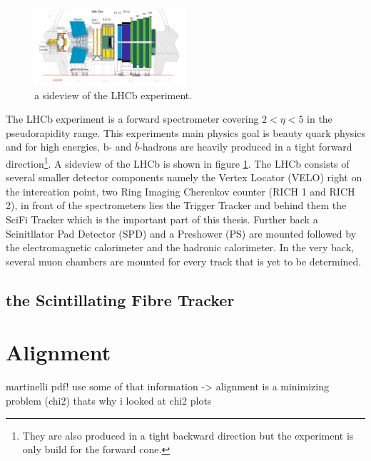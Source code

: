 \begin{figure}
  \centering
  \includegraphics[width=0.5\textwidth]{plots/LHCb_facility.png}
  \caption{a sideview of the LHCb experiment.}
  \label{fig:LHCb}
\end{figure}

The LHCb experiment is a forward spectrometer covering $2 \less \eta \less 5$ in the pseudorapidity range. This experiments main physics goal is beauty quark physics and for high energies, b- and $\bar{b}$-hadrons are heavily produced in a tight forward direction\footnote{They are also produced in a tight backward direction but the experiment is only build for the forward cone.}. A sideview of the LHCb is shown in figure \ref{fig:LHCb}.
The LHCb consists of several smaller detector components namely the Vertex Locator (VELO) right on the intercation point, two Ring Imaging Cherenkov counter (RICH 1 and RICH 2), in front of the spectrometers lies the Trigger Tracker and behind them the SciFi Tracker which is the important part of this thesis. Further back a Scinitllator Pad Detector (SPD) and a Preshower (PS) are mounted followed by the electromagnetic calorimeter and the hadronic calorimeter. In the very back, several muon chambers are mounted for every track that is yet to be determined.

\section{the Scintillating Fibre Tracker\cite{scifiInfo}}
\label{sec:scifi}



\chapter{Alignment}
\label{sec:alignment}
martinelli pdf! use some of that information
-> alignment is a minimizing problem (chi2) thats why i looked at chi2 plots

